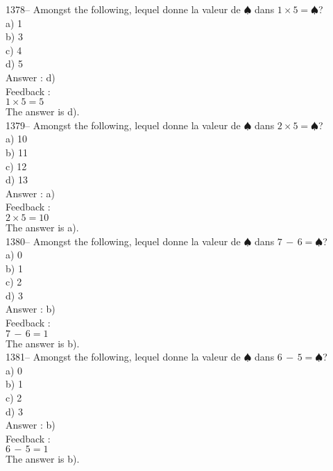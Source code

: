 ﻿\documentclass[letterpaper, 12pt]{article}
\begin{document}
1378-- Amongst the following, lequel donne la valeur de
$\spadesuit$ dans $1\times5=\spadesuit$?\\
a) 1\\
b) 3\\
c) 4\\
d) 5\\

Answer : d)\\

Feedback : \\
$1\times5=5$\\
The answer is d).\\

1379-- Amongst the following, lequel donne la valeur de
$\spadesuit$ dans $2\times5=\spadesuit$?\\
a) 10\\
b) 11\\
c) 12\\
d) 13\\

Answer : a)\\

Feedback : \\
$2\times5=10$\\
The answer is a).\\

1380-- Amongst the following, lequel donne la valeur de
$\spadesuit$ dans $7\,-\,6=\spadesuit$?\\
a) 0\\
b) 1\\
c) 2\\
d) 3\\

Answer : b)\\

Feedback : \\
$7\,-\,6=1$\\
The answer is b).\\

1381-- Amongst the following, lequel donne la valeur de
$\spadesuit$ dans $6\,-\,5=\spadesuit$?\\
a) 0\\
b) 1\\
c) 2\\
d) 3\\

Answer : b)\\

Feedback : \\
$6\,-\,5=1$\\
The answer is b).\\
\end{document}
